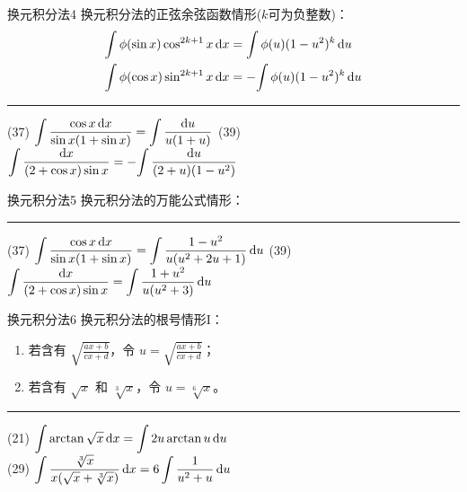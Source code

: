 \documentclass[14pt,notheorems,leqno,xcolor={rgb}]{beamer} %
\begin{document}
\begin{frame}{换元积分法4}
换元积分法的正弦余弦函数情形($k$可为负整数)：
\begin{align*}
 \int\phi(\sin x)\cos^{2k+1} x\mathop{}\!\mathrm{d} x &=\int\phi(u)(1-u^2)^k\mathop{}\!\mathrm{d} u \\
 \int\phi(\cos x)\sin^{2k+1} x\mathop{}\!\mathrm{d} x &=-\!\int\phi(u)(1-u^2)^k\mathop{}\!\mathrm{d} u
\end{align*}
\vspace{0.2em}\hrule\vspace{0.4em}\ppause
(37) $\displaystyle\int\frac{\cos x\mathop{}\!\mathrm{d} x}{\sin x(1+\sin x)}=\int\frac{\mathop{}\!\mathrm{d} u}{u(1+u)}$\vpause
(39) $\displaystyle\int\frac{\mathop{}\!\mathrm{d} x}{(2+\cos x)\sin x}=-\!\int\frac{\mathop{}\!\mathrm{d} u}{(2+u)(1-u^2)}$
\end{frame}

\begin{frame}{换元积分法5}
换元积分法的万能公式情形：\par\scalebox{0.92}{\parbox{\linewidth}{%
\[
 \int\!\phi(\sin x,\cos x)\dx=\!\int\!\phi\left(\frac{2u}{1+u^2},\frac{1-u^2}{1+u^2}\right)\frac2{1+u^2}\du
\]}}
\vspace{0.8em}\hrule\vspace{0.8em}\ppause
(37) $\displaystyle\int\frac{\cos x\mathop{}\!\mathrm{d} x}{\sin x(1+\sin x)}=\int\frac{1-u^2}{u(u^2+2u+1)}\mathop{}\!\mathrm{d} u$\vpause
(39) $\displaystyle\int\frac{\mathop{}\!\mathrm{d} x}{(2+\cos x)\sin x}=\int\frac{1+u^2}{u(u^2+3)}\mathop{}\!\mathrm{d} u$
\end{frame}

\begin{frame}{换元积分法6}
换元积分法的根号情形I：
\begin{enumerate}
  \item 若含有 $\sqrt{\frac{ax+b}{cx+d}}$，令 $u=\sqrt{\frac{ax+b}{cx+d}}$；
  \item 若含有 $\sqrt{x}$ 和 $\sqrt[3]{x}$，令 $u=\sqrt[6]{x}$。
\end{enumerate}
\vspace{0.8em}\hrule\vspace{0.8em}\ppause
(21) $\displaystyle\int\arctan\sqrt x\mathop{}\!\mathrm{d} x=\int 2u\arctan u\mathop{}\!\mathrm{d} u$\\ \pause
(29) $\displaystyle\int\frac{\sqrt[3]x}{x(\sqrt x+\sqrt[3]x)}\mathop{}\!\mathrm{d} x=6\int\frac{1}{u^2+u}\mathop{}\!\mathrm{d} u$
\end{frame}
\end{document}
